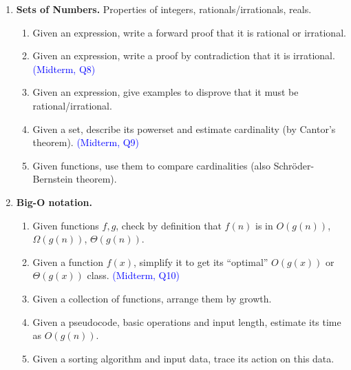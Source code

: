 \documentclass[a4paper,12pt]{article}
\begin{document}
{\begin{enumerate}
\begin{enumerate}
\item Given a function, prove/disprove that it is injective, surjective or bijective. \textcolor{blue}{(Midterm, Q7)}
\item Given function definitions, evaluate their compositions and inverses.
\item Given a sequence, identify its properties, is it (eventually) constant/periodic, etc.
\item Given an expression with elementary functions, $|x|$, $\lfloor x \rfloor$, $\lceil x \rceil$, evaluate it.
\item Given an expression $\sum\limits_{i=0}^n \ldots$ and similar constructs, evaluate it.
\item Given an expression with $2 \times 2$, $2 \times 1$ matrices, add, subtract and multiply them. 
\end{enumerate}
\item \textbf{Sets of Numbers.} Properties of integers, rationals/irrationals, reals.
\begin{enumerate}
\item Given an expression, write a forward proof that it is rational or irrational.
\item Given an expression, write a proof by contradiction that it is irrational. \textcolor{blue}{(Midterm, Q8)}
\item Given an expression, give examples to disprove that it must be rational/irrational.
\item Given a set, describe its powerset and estimate cardinality (by Cantor's theorem).  \textcolor{blue}{(Midterm, Q9)}
\item Given functions, use them to compare cardinalities (also Schröder-Bernstein theorem).
\end{enumerate}
\item \textbf{Big-O notation.} 
\begin{enumerate}
\item Given functions $f,g$, check by definition that $f(n)$ is in $O(g(n))$, $\Omega(g(n))$, $\Theta(g(n))$.
\item Given a function $f(x)$, simplify it to get its ``optimal'' $O(g(x))$ or $\Theta(g(x))$ class. \textcolor{blue}{(Midterm, Q10)}
\item Given a collection of functions, arrange them by growth.
\item Given a pseudocode, basic operations and input length, estimate its time as $O(g(n))$.
\item Given a sorting algorithm and input data, trace its action on this data.

\end{enumerate}
\end{enumerate}}
\end{document}
